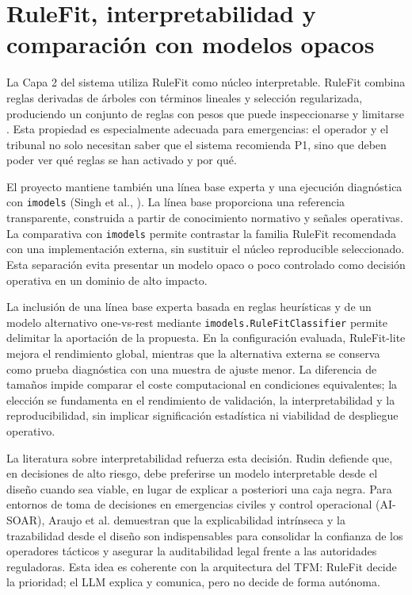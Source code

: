 \section{RuleFit, interpretabilidad y comparación con modelos opacos}

La Capa 2 del sistema utiliza RuleFit como núcleo interpretable. RuleFit combina reglas derivadas de árboles con términos lineales y selección regularizada, produciendo un conjunto de reglas con pesos que puede inspeccionarse y limitarse \cite{Friedman2008RuleFit}. Esta propiedad es especialmente adecuada para emergencias: el operador y el tribunal no solo necesitan saber que el sistema recomienda P1, sino que deben poder ver qué reglas se han activado y por qué.

El proyecto mantiene también una línea base experta y una ejecución diagnóstica con \texttt{imodels} (Singh et al., ). La línea base proporciona una referencia transparente, construida a partir de conocimiento normativo y señales operativas. La comparativa con \texttt{imodels} permite contrastar la familia RuleFit recomendada con una implementación externa, sin sustituir el núcleo reproducible seleccionado. Esta separación evita presentar un modelo opaco o poco controlado como decisión operativa en un dominio de alto impacto.

La inclusión de una línea base experta basada en reglas heurísticas y de un modelo alternativo one-vs-rest mediante \texttt{imodels.RuleFitClassifier} permite delimitar la aportación de la propuesta. En la configuración evaluada, RuleFit-lite mejora el rendimiento global, mientras que la alternativa externa se conserva como prueba diagnóstica con una muestra de ajuste menor. La diferencia de tamaños impide comparar el coste computacional en condiciones equivalentes; la elección se fundamenta en el rendimiento de validación, la interpretabilidad y la reproducibilidad, sin implicar significación estadística ni viabilidad de despliegue operativo.

La literatura sobre interpretabilidad refuerza esta decisión. Rudin \citeyear{Rudin2019} defiende que, en decisiones de alto riesgo, debe preferirse un modelo interpretable desde el diseño cuando sea viable, en lugar de explicar a posteriori una caja negra. Para entornos de toma de decisiones en emergencias civiles y control operacional (AI-SOAR), Araujo et al. \citeyear{Araujo2026XAIFrameworks} demuestran que la explicabilidad intrínseca y la trazabilidad desde el diseño son indispensables para consolidar la confianza de los operadores tácticos y asegurar la auditabilidad legal frente a las autoridades reguladoras. Esta idea es coherente con la arquitectura del TFM: RuleFit decide la prioridad; el LLM explica y comunica, pero no decide de forma autónoma.

